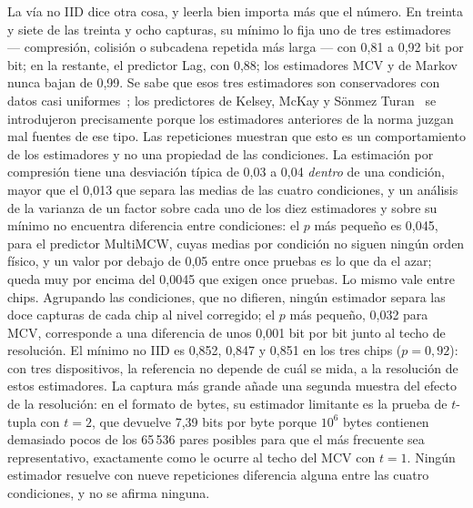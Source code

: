 La vía no IID dice otra cosa, y leerla bien importa más que el número. En
treinta y siete de las treinta y ocho capturas, su mínimo lo fija uno de tres
estimadores --- compresión, colisión o subcadena repetida más larga --- con
0,81 a 0,92 bit por bit; en la restante, el predictor Lag, con 0,88; los
estimadores MCV y de Markov nunca bajan de 0,99. Se sabe que esos tres
estimadores son conservadores con datos casi uniformes~\cite{zhu_2017_analysis};
los predictores de Kelsey, McKay y S\"onmez Turan~\cite{kelsey_2015_predictive}
se introdujeron precisamente porque los estimadores anteriores de la norma
juzgan mal fuentes de ese tipo. Las repeticiones muestran que esto es un
comportamiento de los estimadores y no una propiedad de las condiciones.
La estimación por compresión tiene una desviación típica de 0,03 a 0,04
\emph{dentro} de una condición, mayor que el 0,013 que separa las medias
de las cuatro condiciones, y un análisis de la varianza de un factor
sobre cada uno de los diez estimadores y sobre su mínimo no encuentra diferencia entre
condiciones: el $p$ más pequeño es 0,045, para el predictor MultiMCW,
cuyas medias por condición no siguen ningún orden físico, y un valor por
debajo de 0,05 entre once pruebas es lo que da el azar; queda muy por
encima del 0,0045 que exigen once pruebas. Lo mismo vale entre chips.
Agrupando las condiciones, que no difieren, ningún estimador separa las
doce capturas de cada chip al nivel corregido; el $p$ más pequeño, 0,032
para MCV, corresponde a una diferencia de unos 0,001 bit por bit junto
al techo de resolución. El mínimo no IID es 0,852, 0,847 y 0,851 en los
tres chips ($p = 0{,}92$): con tres dispositivos, la
referencia no depende de cuál se mida, a la resolución de estos
estimadores. La captura más grande añade una segunda muestra del efecto
de la resolución: en el formato de bytes, su estimador limitante es la
prueba de $t$-tupla con $t = 2$, que devuelve 7,39 bits por byte porque
$10^6$ bytes contienen demasiado pocos de los 65\,536 pares posibles para
que el más frecuente sea representativo, exactamente como le ocurre al
techo del MCV con $t = 1$. Ningún estimador resuelve con nueve
repeticiones diferencia alguna entre las cuatro condiciones, y no se
afirma ninguna.

